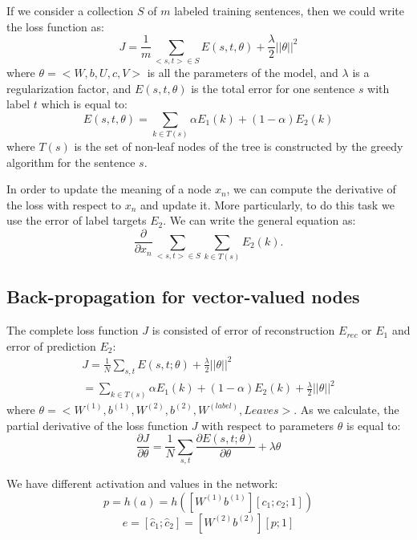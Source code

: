 \documentclass[twoside,12pt]{article}
\begin{document}
If we consider a collection $S$ of $m$ labeled training sentences, then we could write the loss function as:
\begin{equation}
J=\frac{1}{m}\sum_{<s,t> \in S}E(s,t,\theta)+\frac{\lambda}{2}||\theta||^2
\end{equation}
where $\theta=<W,b,U,c,V>$ is all the parameters of the model, and $\lambda$ is a regularization factor, and $E(s,t,\theta)$ is the total error for one sentence $s$ with label $t$ which is equal to:
\begin{equation}
E(s,t,\theta)=\sum_{k \in T(s)}\alpha E_1(k)+(1-\alpha)E_2(k)
\end{equation}
where $T(s)$ is the set of non-leaf nodes of the tree is constructed by the greedy algorithm for the sentence $s$. 

In order to update the meaning of a node $x_n$, we can compute the derivative of the loss with respect to $x_n$ and update it. More particularly, to do this task we use the error of label targets $E_2$. We can write the general equation as:
\begin{equation}
\frac{\partial}{\partial x_n}\sum_{<s,t>\in S}\sum_{k \in T(s)}E_2(k).
\end{equation}
\subsection{Back-propagation for vector-valued nodes}
The complete loss function $J$ is consisted of error of reconstruction $E_{rec}$ or $E_1$ and error of prediction $E_2$:
\begin{align}
J=\frac{1}{N}\sum_{s,t}E(s,t;\theta)+\frac{\lambda}{2}||\theta||^2\\
=\sum_{k \in T(s)}\alpha E_1(k)+(1-\alpha)E_2(k)+\frac{\lambda}{2}||\theta||^2
\end{align}
where $\theta=<W^{(1)},b^{(1)},W^{(2)},b^{(2)},W^{(label)},Leaves>$. As we calculate, the partial derivative of the loss function $J$ with respect to parameters $\theta$ is equal to:
\begin{equation}
\frac{\partial J}{\partial \theta}=\frac{1}{N}\sum_{s,t}\frac{\partial E(s,t;\theta)}{\partial \theta}+\lambda \theta
\end{equation}

We have different activation and values in the network:
\begin{equation}
p=h(a)=h([W^{(1)} b^{(1)}][c_1;c_2;1])
\end{equation}
\begin{equation}
e=[\hat{c}_1;\hat{c}_2]=[W^{(2)} b^{(2)}][p;1]
\end{equation}
\end{document}
